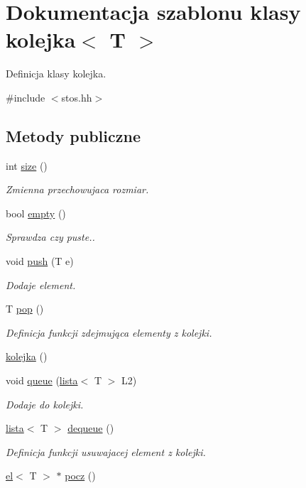 \hypertarget{classkolejka}{\section{\-Dokumentacja szablonu klasy kolejka$<$ \-T $>$}
\label{classkolejka}
}


\-Definicja klasy kolejka.  




{\ttfamily \#include $<$stos.\-hh$>$}

\subsection*{\-Metody publiczne}
\begin{DoxyCompactItemize}
\item 
int \hyperlink{classkolejka_a97c873e61c9d08a08ddec5c0a784aaec}{size} ()
\begin{DoxyCompactList}\small\item\em \-Zmienna przechowujaca rozmiar. \end{DoxyCompactList}\item 
bool \hyperlink{classkolejka_a2a5984247b91f8d4b96c1104755c14ee}{empty} ()
\begin{DoxyCompactList}\small\item\em \-Sprawdza czy puste.. \end{DoxyCompactList}\item 
void \hyperlink{classkolejka_a9ab5091d52ebfe6cb4785bfd4ec2a0b9}{push} (\-T e)
\begin{DoxyCompactList}\small\item\em \-Dodaje element. \end{DoxyCompactList}\item 
\-T \hyperlink{classkolejka_aed8feb84d0962f52961325340bd6ee92}{pop} ()
\begin{DoxyCompactList}\small\item\em \-Definicja funkcji zdejmująca elementy z kolejki. \end{DoxyCompactList}\item 
\hyperlink{classkolejka_ae1c55bf81416aceaa811879e58263743}{kolejka} ()
\item 
void \hyperlink{classkolejka_a3802e595aad03b06e547714f5aa73a1d}{queue} (\hyperlink{classlista}{lista}$<$ \-T $>$ \-L2)
\begin{DoxyCompactList}\small\item\em \-Dodaje do kolejki. \end{DoxyCompactList}\item 
\hyperlink{classlista}{lista}$<$ \-T $>$ \hyperlink{classkolejka_a88cae02e37f9f6a7891c45f6490de6d6}{dequeue} ()
\begin{DoxyCompactList}\small\item\em \-Definicja funkcji usuwajacej element z kolejki. \end{DoxyCompactList}\item 
\hyperlink{classel}{el}$<$ \-T $>$ $\ast$ \hyperlink{classkolejka_a662375b176addc87e5b6b91f1555ad09}{pocz} ()
\end{DoxyCompactItemize}
